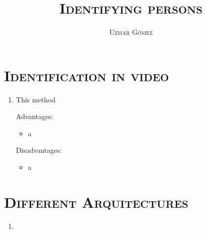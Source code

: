\documentclass[10pt,letterpaper]{article}
\title{{\scshape\huge Identifying persons}}
\author{{\scshape\Large Uzmar Gómez}}
\newcommand{\ssection}[1]{%
  \section*{\normalfont\scshape #1}}
\begin{document}
\maketitle

\ssection{Identification in video}

\begin{enumerate}
    \item[] \underline{}

    This method

    Advantages:
    \begin{itemize}
        \item a
    \end{itemize}

    Disadvantages:
    \begin{itemize}
        \item a
    \end{itemize}
\end{enumerate}

\ssection{Different Arquitectures}

\begin{enumerate}
    \item[] \underline{}
\end{enumerate}
\end{document}
